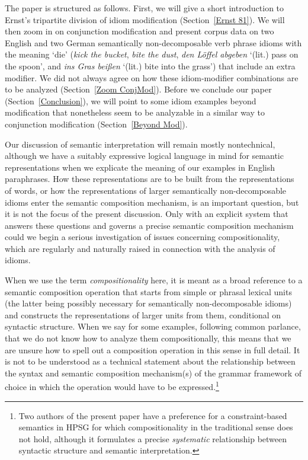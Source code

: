 \documentclass[output=paper]{langsci/langscibook}
\begin{document}
The paper is structured as follows. First, we will give a short introduction to Ernst's tripartite division of idiom modification (\mbox{Section \ref{Ernst 81}}). We will then zoom in on conjunction modification and present corpus data on two English and two German semantically non-decomposable verb phrase idioms with the meaning `die' (\textit{kick the bucket}, \textit{bite the dust}, \textit{den Löffel abgeben} `(lit.) pass on the spoon', and \textit{ins Gras beißen} `(lit.) bite into the grass') that include an extra modifier. %
We did not always agree on how these idiom-modifier combinations are to be analyzed (\mbox{Section \ref{Zoom ConjMod}}). Before we conclude our paper (\mbox{Section \ref{Conclusion}}), we will point to some idiom examples beyond modification that nonetheless seem to be analyzable in a similar way %
to conjunction modification (\mbox{Section \ref{Beyond Mod}}).

Our discussion of semantic interpretation will remain mostly nontechnical, although we have a suitably expressive logical language in mind for semantic representations when we explicate the meaning of our examples in English paraphrases. How these representations are to be built from the representations of words, or how the representations of larger semantically non-decomposable idioms enter the semantic composition mechanism, is an important question, but it is not the focus of the present discussion. Only with an explicit system that answers these questions and governs a precise semantic composition mechanism could we begin a serious investigation of issues concerning compositionality, which are regularly and naturally raised in connection with the analysis of idioms.

When we use the term \textit{compositionality} here, it is meant as a broad reference to a semantic composition operation that starts from simple or phrasal lexical units (the latter being possibly necessary for semantically non-decomposable idioms) and constructs the representations of larger units from them, conditional on syntactic structure. When we say for some examples, following common parlance, that we do not know how to analyze them compositionally, this means that we are unsure how to spell out a composition operation in this sense in full detail. It is not to be understood as a technical statement about the relationship between the syntax and semantic composition mechanism(s) of the grammar framework of choice in which the operation would have to be expressed.\footnote{Two authors of the present paper have a preference for a constraint-based semantics in HPSG for which compositionality in the traditional sense does not hold, although it formulates a precise \textit{systematic} relationship between syntactic structure and semantic interpretation.}
\end{document}
